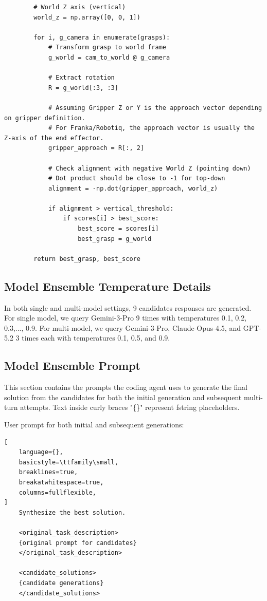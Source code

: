 \begin{lstlisting}
        # World Z axis (vertical)
        world_z = np.array([0, 0, 1])

        for i, g_camera in enumerate(grasps):
            # Transform grasp to world frame
            g_world = cam_to_world @ g_camera

            # Extract rotation
            R = g_world[:3, :3]

            # Assuming Gripper Z or Y is the approach vector depending on gripper definition.
            # For Franka/Robotiq, the approach vector is usually the Z-axis of the end effector.
            gripper_approach = R[:, 2]

            # Check alignment with negative World Z (pointing down)
            # Dot product should be close to -1 for top-down
            alignment = -np.dot(gripper_approach, world_z)

            if alignment > vertical_threshold:
                if scores[i] > best_score:
                    best_score = scores[i]
                    best_grasp = g_world

        return best_grasp, best_score
\end{lstlisting}

\subsection{Model Ensemble Temperature Details}
\label{app:model_ensemble_details}
In both single and multi-model settings, 9 candidates responses are generated. For single model, we query Gemini-3-Pro 9 times with temperatures 0.1, 0.2, 0.3,..., 0.9. For multi-model, we query Gemini-3-Pro, Claude-Opus-4.5, and GPT-5.2 3 times each with temperatures 0.1, 0.5, and 0.9.

\subsection{Model Ensemble Prompt}
\label{app:model_ensemble_prompt}
This section contains the prompts the coding agent uses to generate the final solution from the candidates for both the initial generation and subsequent multi-turn attempts. Text inside curly braces "\{\}" represent fstring placeholders.

User prompt for both initial and subsequent generations:
\begin{lstlisting}[
    language={},
    basicstyle=\ttfamily\small,
    breaklines=true,
    breakatwhitespace=true,
    columns=fullflexible,
]
    Synthesize the best solution.

    <original_task_description>
    {original prompt for candidates}
    </original_task_description>

    <candidate_solutions>
    {candidate generations}
    </candidate_solutions>
\end{lstlisting}


